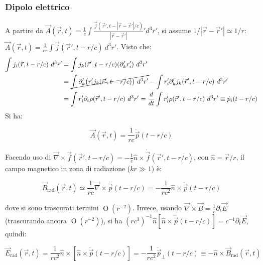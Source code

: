 \documentclass[10pt, a4paper]{scrartcl}
\numberwithin{equation}{subsection}
\theoremstyle{style1}
\newenvironment{boxenv}[1][]{
    \begin{eqbox}[#1]
    }{
   \end{eqbox}
}
\begin{document}
\subsubsection{Dipolo elettrico}
A partire da $\vec{A}(\vec{r},t) = \frac{1}{c}\int \frac{\vec{j}(\vec{r}', t - \left\lvert \vec{r}- \vec{r}'\right\rvert /c)}{\left\lvert \vec{r}-\vec{r}' \right\rvert }  ' d^3 r'$, si assume $1/\left\lvert \vec{r}-\vec{r}' \right\rvert \simeq 1 / r $: $\vec{A}(\vec{r},t) = \frac{1}{cr} \int \vec{j}(\vec{r}', t - r / c) \ d^3 r'$. Visto che:
\[
\begin{split}
	\int j_i (\vec{r} , t - r/ c) \ d^3 r' &= \int j_k(\vec{r}', t - r / c) (\partial _k' r_i' )\ d^3 r'\\
	&= \cancel{\int \partial _k' \big(r'_i j_k (\vec{r}', t - r / c)\big) \ d^3 r'} - \int r'_i \partial '_k j_k (\vec{r}', t- r / c) \ d^3 r'\\
	&=\int r'_i \partial _t \rho (\vec{r}', t - r / c)\ d^3 r' = \frac{d }{d t} \int r'_i \rho (\vec{r}', t - r/c) \ d^3 r' \equiv \dot{p}_i (t - r / c) 
\end{split}
\] 
Si ha:
\begin{boxenv}[]
\begin{equation} 
\vec{A}(\vec{r},t) = \frac{1}{rc} \dot{\vec{p}}(t - r / c) 
\end{equation}
\end{boxenv}
\noindent Facendo uso di $\vec{\nabla }\times \vec{f}(\vec{r}', t- r / c) = -\frac{1}{c} \hat{n}\times \dot{\vec{f}}(\vec{r}', t - r / c)$, con $\hat{n}= \vec{r} / r$, il campo magnetico in zona di radiazione ($kr \gg 1)$ \`e:
\begin{boxenv}[]
\begin{equation}
	\vec{B}_\text{rad}(\vec{r},t)\simeq \frac{1}{rc} \vec{\nabla }\times \dot{\vec{p}}(t - r / c) = -\frac{1}{rc^2} \hat{n} \times \ddot{\vec{p}}(t - r / c )
\end{equation}
\end{boxenv}
\noindent dove si sono trascurati termini $\operatorname{O} (r^{-2} )$. Invece, usando $\vec{\nabla }\times \vec{B} = \frac{1}{c}\partial _t \vec{E}$ (trascurando ancora $\operatorname{O} (r^{-2} )$), si ha $(rc^3)^{-1} \hat{n}\left[ \hat{n}\times \dddot{\vec{p}}(t- r / c)\right] = c^{-1} \partial _t \vec{E}$, quindi:
\begin{boxenv}[]
\begin{equation}
	\vec{E}_\text{rad}(\vec{r},t)= \frac{1}{rc^2 } \hat{n}\times \left[ \hat{n}\times \ddot{\vec{p}}(t-r / c) \right] = - \frac{1}{rc^2}\ddot{\vec{p}}_\perp (t-  r / c) \equiv - \hat{n}\times \vec{B}_\text{rad}(\vec{r},t)
\end{equation}
\end{boxenv}
\end{document}
